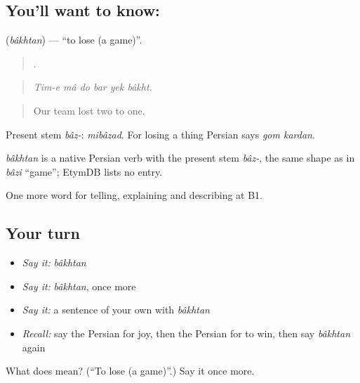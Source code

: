 \subsection*{You'll want to know: }
\textbf{} (\emph{bâkhtan}) — \textquotedblleft{}to lose (a game)\textquotedblright{}.

\begin{quote}
     .
\end{quote}

\begin{quote}
\emph{Tim-e mâ do bar yek bâkht.}
\end{quote}

\begin{quote}
Our team lost two to one.
\end{quote}

Present stem \emph{bâz-}: \emph{mibâzad}. For losing a thing Persian says \emph{gom kardan}.

\begin{cousinweb}
\emph{bâkhtan} is a native Persian verb with the present stem \emph{bâz-}, the same shape as in \emph{bâzi} \textquotedblleft{}game\textquotedblright{}; EtymDB lists no entry.
\end{cousinweb}

\begin{grammarlens}[title={What you've built}]
One more word for telling, explaining and describing at B1.
\end{grammarlens}

\subsection*{Your turn}
\begin{itemize}
\raggedright
  \item \emph{Say it:} \emph{bâkhtan}
  \item \emph{Say it:} \emph{bâkhtan}, once more
  \item \emph{Say it:} a sentence of your own with \emph{bâkhtan}
  \item \emph{Recall:} say the Persian for joy, then the Persian for to win, then say \emph{bâkhtan} again
\end{itemize}

\begin{tcolorbox}[breakable,colback=teal!4,colframe=teal!35!black,title={Before you move on}]
What does  mean? (\textquotedblleft{}To lose (a game)\textquotedblright{}.) Say it once more.
\end{tcolorbox}

